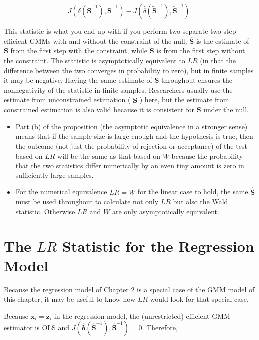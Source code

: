 \documentclass[10pt]{article}
\begin{document}
$$
J\left(\bar{\delta}\left(\overline{\mathbf{S}}^{-1}\right), \overline{\mathbf{S}}^{-1}\right)-J\left(\hat{\delta}\left(\widetilde{\mathbf{S}}^{-1}\right), \widetilde{\mathbf{S}}^{-1}\right) .
$$

This statistic is what you end up with if you perform two separate two-step efficient GMMs with and without the constraint of the null; $\overline{\mathbf{S}}$ is the estimate of $\mathbf{S}$ from the first step with the constraint, while $\widetilde{\mathbf{S}}$ is from the first step without the constraint. The statistic is asymptotically equivalent to $L R$ (in that the difference between the two converges in probability to zero), but in finite samples it may be negative. Having the same estimate of $\mathbf{S}$ throughout ensures the nonnegativity of the statistic in finite samples. Researchers usually use the estimate from unconstrained estimation ( $\widetilde{\mathbf{S}}$ ) here, but the estimate from constrained estimation is also valid because it is consistent for $\mathbf{S}$ under the null.

\begin{itemize}
  \item Part (b) of the proposition (the asymptotic equivalence in a stronger sense) means that if the sample size is large enough and the hypothesis is true, then the outcome (not just the probability of rejection or acceptance) of the test based on $L R$ will be the same as that based on $W$ because the probability that the two statistics differ numerically by an even tiny amount is zero in sufficiently large samples.
  \item For the numerical equivalence $L R=W$ for the linear case to hold, the same $\widehat{\mathbf{S}}$ must be used throughout to calculate not only $L R$ but also the Wald statistic. Otherwise $L R$ and $W$ are only asymptotically equivalent.
\end{itemize}

\section*{The $L R$ Statistic for the Regression Model}
Because the regression model of Chapter 2 is a special case of the GMM model of this chapter, it may be useful to know how $L R$ would look for that special case.

Because $\mathbf{x}_{i}=\mathbf{z}_{i}$ in the regression model, the (unrestricted) efficient GMM estimator is OLS and $J\left(\hat{\boldsymbol{\delta}}\left(\widehat{\mathbf{S}}^{-1}\right), \widehat{\mathbf{S}}^{-1}\right)=0$. Therefore,
\end{document}
